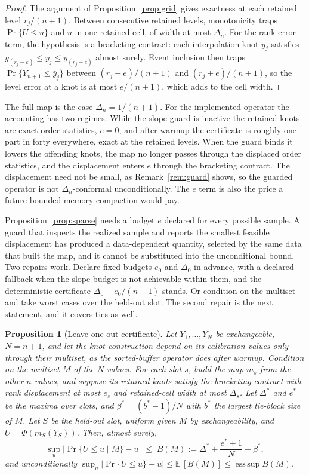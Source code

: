 \documentclass[11pt]{article}
\newtheorem{proposition}{Proposition}
\theoremstyle{remark}
\begin{document}
\begin{proof}
The argument of Proposition~\ref{prop:grid} gives exactness at each retained level
$r_j/(n+1)$. Between consecutive retained levels, monotonicity traps
$\Pr\{U \le u\}$ and $u$ in one retained cell, of width at most $\Delta_n$. For
the rank-error term, the hypothesis is a bracketing contract: each interpolation knot
$\bar y_j$ satisfies $y_{(r_j - e)} \le \bar y_j \le y_{(r_j + e)}$ almost surely.
Event inclusion then traps $\Pr\{Y_{n+1} \le \bar y_j\}$ between
$(r_j - e)/(n+1)$ and $(r_j + e)/(n+1)$, so the level error at a knot is at most
$e/(n+1)$, which adds to the cell width.
\end{proof}

The full map is the case $\Delta_n = 1/(n+1)$. For the implemented operator the
accounting has two regimes. While the slope guard is inactive the retained knots are
exact order statistics, $e = 0$, and after warmup the certificate is roughly one part
in forty everywhere, exact at the retained levels. When the guard binds it lowers the
offending knots, the map no longer passes through the displaced order statistics, and
the displacement enters $e$ through the bracketing contract. The displacement need
not be small, as Remark~\ref{rem:guard} shows, so the guarded operator is not
$\Delta_n$-conformal unconditionally. The $e$ term is also the price a future
bounded-memory compaction would pay.

Proposition~\ref{prop:sparse} needs a budget $e$ declared for every possible
sample.
A guard that inspects the realized sample and reports the smallest feasible
displacement has produced a data-dependent quantity, selected by the same data that
built the map, and it cannot be substituted into the unconditional bound. Two repairs
work. Declare fixed budgets $e_0$ and $\Delta_0$ in advance, with a declared
fallback when the slope budget is not achievable within them, and the deterministic
certificate $\Delta_0 + e_0/(n+1)$ stands. Or condition on the multiset and take
worst cases over the held-out slot. The second repair is the next statement, and it
covers ties as well.

\begin{proposition}[Leave-one-out certificate]\label{prop:loo}
Let $Y_1, \dots, Y_N$ be exchangeable, $N = n + 1$, and let the knot construction
depend on its calibration values only through their multiset, as the sorted-buffer
operator does after warmup. Condition on the multiset $M$ of the $N$ values. For each
slot $s$, build the map $m_s$ from the other $n$ values, and suppose its retained
knots satisfy the bracketing contract with rank displacement at most $e_s$ and
retained-cell width at most $\Delta_s$. Let $\Delta^*$ and $e^*$ be the maxima over
slots, and $\beta^* = (b^* - 1)/N$ with $b^*$ the largest tie-block size of $M$.
Let $S$ be the held-out slot, uniform given $M$ by exchangeability, and
$U = \Phi(m_S(Y_S))$. Then, almost surely,
\[
  \sup_u \big| \Pr\{U \le u \mid M\} - u \big| \;\le\;
  B(M) := \Delta^* + \frac{e^* + 1}{N} + \beta^*,
\]
and unconditionally
$\sup_u |\Pr\{U \le u\} - u| \le \mathbb{E}\,[B(M)] \le
\operatorname{ess\,sup} B(M)$.
\end{proposition}
\end{document}
